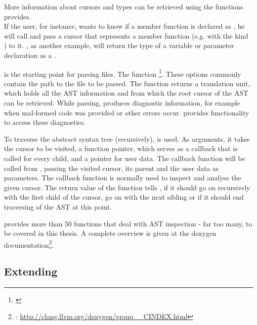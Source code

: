 More information about cursors and types can be retrieved using the functions  provides.
\\If the user, for instance, wants to know if a member function is declared as , he will call  and pass a cursor that represents a member function (e.g. with the kind ) to it. , as another example, will return the type of a variable or parameter declaration as a .

 is the starting point for parsing  files. The function \footnote{\citep{ClangAPIDoc}}. These options commonly contain the path to the file to be parsed. The function returns a translation unit, which holds all the AST information and from which the root cursor of the AST can be retrieved. While parsing,  produces diagnostic information, for example when mal-formed  code was provided or other errors occur.  provides functionality to access these diagnostics.

To traverse the abstract syntax tree (recursively),  is used. As arguments, it takes the cursor to be visited, a function pointer, which serves as a callback that is called for every child, and a  pointer for user data. The callback function will be called from , passing the visited cursor, its parent and the user data as parameters. The callback function is normally used to inspect and analyse the given cursor. The return value of the function tells , if it should go on recursively with the first child of the cursor, go on with the next sibling or if it should end traversing of the AST at this point.

 provides more than 50 functions that deal with AST inspection - far too many, to be covered in this thesis. A complete overview is given at the  doxygen documentation\footnote{: \url{http://clang.llvm.org/doxygen/group\_\_CINDEX.html}}.

\subsection{Extending }

